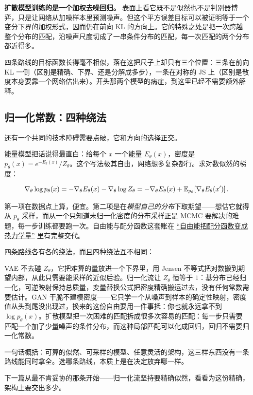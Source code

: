 \textbf{扩散模型训练的是一个加权去噪回归。} 表面上看它既不是似然也不是判别器博弈，只是让网络从加噪样本里预测噪声。但这个平方误差目标可以被证明等于一个变分下界的加权形式，因而仍在前向 KL 的方向上。它的特殊之处是把一次跨越整个分布的匹配，沿噪声尺度切成了一串条件分布的匹配，每一次匹配的两个分布都近得多。

四条路线的目标函数长得毫不相似，落在这把尺子上却只有三个位置：三条在前向 KL 一侧（区别是精确、下界、还是分解成多步），一条在对称的 JS 上（区别是散度本身要靠一个网络估出来）。开头那两个模型的病症，到这里已经不需要额外解释。

\subsection{归一化常数：四种绕法}

还有一个共同的技术障碍需要点破，它和方向的选择正交。

能量模型把话说得最直白：给每个 \(x\) 一个能量 \(E_\theta(x)\)，密度是 \(p_\theta(x)=e^{-E_\theta(x)}/Z_\theta\)。这个写法极其自由，网络想多复杂都行。求对数似然的梯度：

\[
\nabla_\theta\log p_\theta(x)
=-\nabla_\theta E_\theta(x)-\nabla_\theta\log Z_\theta
=-\nabla_\theta E_\theta(x)+\mathbb{E}_{p_\theta}\!\left[\nabla_\theta E_\theta(x')\right].
\]

第一项在数据点上算，便宜。第二项是在\emph{模型自己的分布}下取期望——想估它就得从 \(p_\theta\) 采样，而从一个只知道未归一化密度的分布采样正是 MCMC 要解决的难题，每一步训练都要跑一次。自由能与配分函数这套账在 \hyperref[sec:13-Machine-Learning/13-Statistical-Physics-and-Free-Energy/01]{``自由能把配分函数变成热力学量''} 里有完整交代。

四条路线各有各的绕法，而且四种绕法互不相同：

VAE 不去碰 \(Z_\theta\)，它把难算的量放进一个下界里，用 Jensen 不等式把对数搬到期望内部，从此只需要能采样的近似后验。归一化流让 \(Z_\theta\) 恒等于 \(1\)：基分布已经归一化，可逆映射保持总质量，变量替换公式把密度精确搬运过去，没有任何常数需要估计。GAN 干脆不建模密度——它只学一个从噪声到样本的确定性映射，密度值从头到尾没出现过，换来的这份自由要用一件事抵：你也就永远拿不到 \(\log p_\theta(x)\)。扩散模型把一次困难的匹配拆成很多次容易的匹配：每一步只需要匹配一个加了少量噪声的条件分布，而这种局部匹配可以化成回归，回归不需要归一化常数。

一句话概括：可算的似然、可采样的模型、任意灵活的架构，这三样东西没有一条路线能同时拿全。选哪条路线，本质上是在决定放弃哪一样。

下一篇从最不肯妥协的那条开始——归一化流坚持要精确似然，看看为这份精确，架构上要交出多少。

